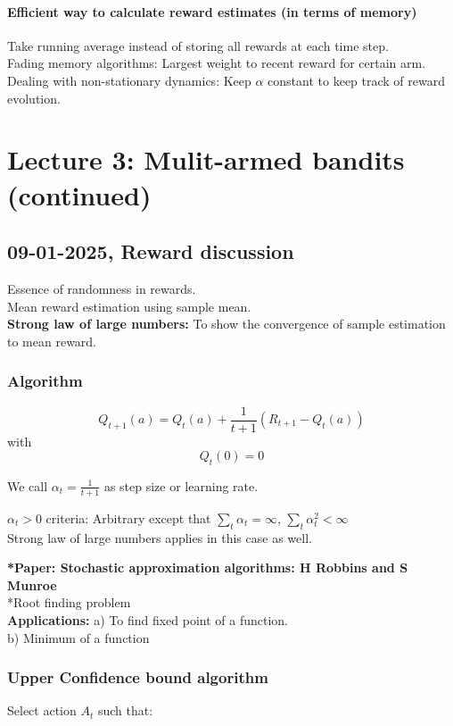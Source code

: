 \documentclass{book}
\begin{document}
\subsubsection{Efficient way to calculate reward estimates (in terms of memory)}
Take running average instead of storing all rewards at each time step.\\
Fading memory algorithms: Largest weight to recent reward for certain arm.\\
Dealing with non-stationary dynamics: Keep $\alpha$ constant to keep track of reward evolution.

\chapter{Lecture 3: Mulit-armed bandits (continued)}
\section{09-01-2025, Reward discussion}
Essence of randomness in rewards.\\
Mean reward estimation using sample mean.\\
\textbf{Strong law of large numbers:} To show the convergence of sample estimation to mean reward.

\subsection{Algorithm}
$$
Q_{t+1}(a) = Q_{t}(a) + \frac{1}{t+1}(R_{t+1} - Q_{t}(a))
$$
with
$$
Q_{t}(0) = 0
$$

We call $\alpha_{t} = \frac{1}{t+1}$ as step size or learning rate.

$\alpha_{t} > 0$ criteria: Arbitrary except that $\sum_{t} \alpha_{t} = \infty$, $\sum_{t} \alpha_{t}^{2} < \infty$\\

Strong law of large numbers applies in this case as well.

\textbf{*Paper: Stochastic approximation algorithms: H Robbins and S Munroe}\\

\noindent   **Root finding problem\\
\textbf{Applications:} 
a) To find fixed point of a function.\\
b) Minimum of a function\\


\subsection{Upper Confidence bound algorithm}
Select action $A_{t}$ such that:\\
\end{document}
